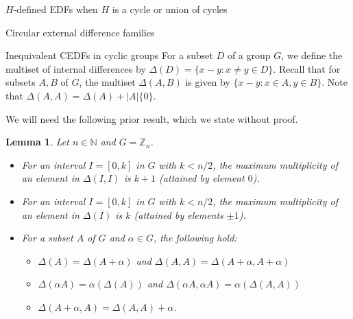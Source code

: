 \documentclass[12pt, a4paper]{article}
\newtheorem{lemma}[theorem]{Lemma}
\theoremstyle{definition}
\begin{document}
\begin{section}{$H$-defined EDFs when $H$ is a cycle or union of cycles}
\begin{subsection}{Circular external difference families}
\begin{subsection}{Inequivalent CEDFs in cyclic groups}
For a subset $D$ of a group $G$, we define the multiset of internal differences by $\Delta(D)=\{x-y: x \neq y \in D\}$.  Recall that for subsets $A,B$ of $G$, the multiset $\Delta(A,B)$ is given by $\{x-y: x \in A, y \in B\}$. Note that $\Delta(A,A)=\Delta(A)+ |A| \{0\}$.

We will need the following prior result, which we state without proof.

\begin{lemma}\label{lem:intdiffs}
Let $n \in \mathbb{N}$ and $G=\mathbb{Z}_n$.
\begin{itemize}
\item[(i)]  For an interval $I=[0,k]$ in $G$ with $k<n/2$, the maximum multiplicity of an element in $\Delta(I,I)$ is $k+1$ (attained by element $0$).
\item[(ii)] For an interval $I=[0,k]$ in $G$ with $k<n/2$, the maximum multiplicity of an element in $\Delta(I)$ is $k$ (attained by elements $\pm 1$).
\item[(iii)] For a subset $A$ of $G$ and $\alpha \in G$, the following hold:
\begin{itemize}
 \item [1)] $\Delta(A) = \Delta(A+\alpha)$ and $\Delta(A,A) = \Delta(A+\alpha, A+ \alpha)$ 
\item [(2)] $\Delta(\alpha A) = \alpha (\Delta(A))$ and $\Delta(\alpha A, \alpha A) = \alpha (\Delta(A,A))$
\item [(3)] $\Delta(A+\alpha, A) =\Delta(A,A)+\alpha$.
\end{itemize}
\end{itemize}
\end{lemma}



\end{subsection}
\end{subsection}
\end{section}
\end{document}
